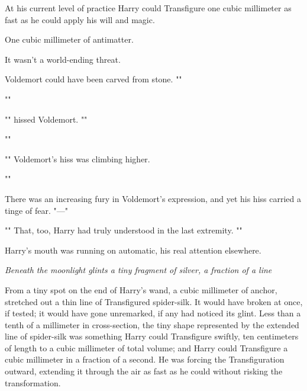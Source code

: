At his current level of practice Harry could Transfigure one cubic millimeter
as fast as he could apply his will and magic.

One cubic millimeter of antimatter.

It wasn't a world-ending threat.

Voldemort could have been carved from stone. ""

""

"" hissed Voldemort. ""

""

"" Voldemort's hiss was climbing
higher.

""

There was an increasing fury in Voldemort's expression, and yet his hiss
carried a tinge of fear. "---"

"" That, too, Harry had truly understood in the last extremity.
""

Harry's mouth was running on automatic, his real attention elsewhere.

\emph{Beneath the moonlight glints a tiny fragment of silver, a fraction of a
line{\el}}

From a tiny spot on the end of Harry's wand, a cubic millimeter of anchor,
stretched out a thin line of Transfigured spider-silk. It would have broken at
once, if tested; it would have gone unremarked, if any had noticed its glint.
Less than a tenth of a millimeter in cross-section, the tiny shape represented
by the extended line of spider-silk was something Harry could Transfigure
swiftly, ten centimeters of length to a cubic millimeter of total volume; and
Harry could Transfigure a cubic millimeter in a fraction of a second. He was
forcing the Transfiguration outward, extending it through the air as fast as he
could without risking the transformation.

